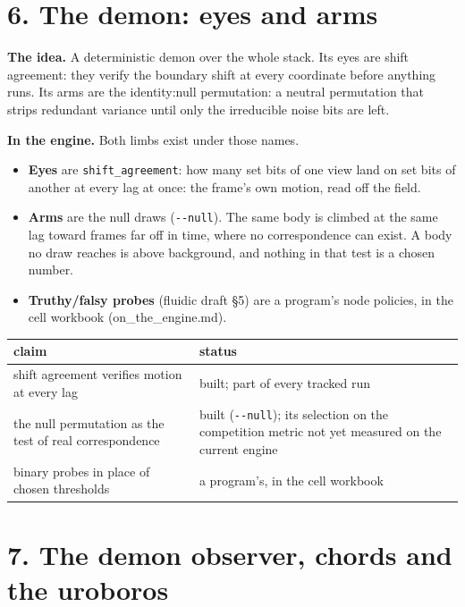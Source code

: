 \section{\texorpdfstring{6. The demon: eyes and arms}{6. The demon: eyes and arms}}

\textbf{The idea.} A deterministic demon over the whole stack. Its eyes are shift agreement: they verify the boundary shift at every coordinate before anything runs. Its arms are the identity:null permutation: a neutral permutation that strips redundant variance until only the irreducible noise bits are left.

\textbf{In the engine.} Both limbs exist under those names.

\begin{itemize}
\item \textbf{Eyes} are \texttt{shift\_\allowbreak{}agreement}: how many set bits of one view land on set bits of another at every lag at once: the frame's own motion, read off the field.
\item \textbf{Arms} are the null draws (\texttt{-\allowbreak{}-\allowbreak{}null}). The same body is climbed at the same lag toward frames far off in time, where no correspondence can exist. A body no draw reaches is above background, and nothing in that test is a chosen number.
\item \textbf{Truthy/falsy probes} (fluidic draft §5) are a program's node policies, in the cell workbook (on\_\allowbreak{}the\_\allowbreak{}engine.md).
\end{itemize}

{\small
\setlength{\tabcolsep}{6pt}
\begin{longtable}{>{\RaggedRight\arraybackslash}p{}>{\RaggedRight\arraybackslash}p{}}
\toprule
claim & status \\
\midrule
\endhead
shift agreement verifies motion at every lag & built; part of every tracked run \\
the null permutation as the test of real correspondence & built (\texttt{-\allowbreak{}-\allowbreak{}null}); its selection on the competition metric not yet measured on the current engine \\
binary probes in place of chosen thresholds & a program's, in the cell workbook \\
\bottomrule
\end{longtable}
}

\section{\texorpdfstring{7. The demon observer, chords and the uroboros}{7. The demon observer, chords and the uroboros}}


